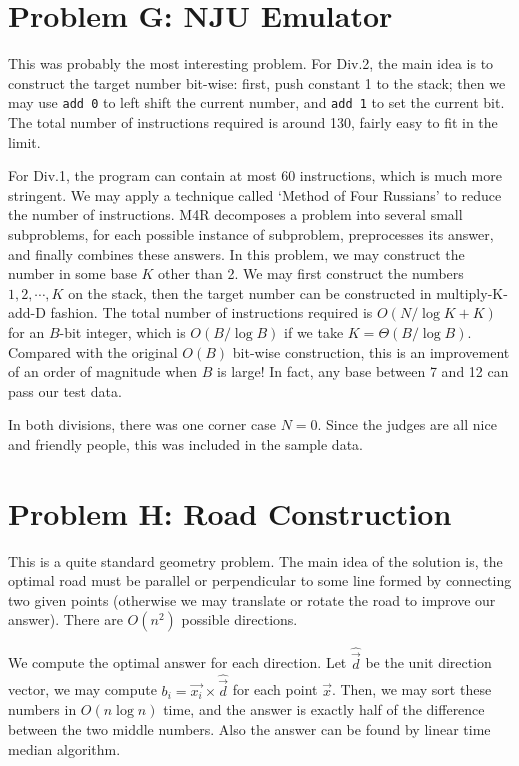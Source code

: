 \documentclass[a4paper,10.5pt,twoside]{article}
\begin{document}
\section*{Problem G: NJU Emulator}

This was probably the most interesting problem. For Div.2, the main idea is to construct the target number bit-wise: first, push constant 1 to the stack; then we may use \texttt{add 0} to left shift the current number, and \texttt{add 1} to set the current bit. The total number of instructions required is around 130, fairly easy to fit in the limit.

For Div.1, the program can contain at most 60 instructions, which is much more stringent. We may apply a technique called `Method of Four Russians' to reduce the number of instructions. M4R decomposes a problem into several small subproblems,  for each possible instance of subproblem, preprocesses its answer, and finally combines these answers. In this problem, we may construct the number in some base $K$ other than 2. We may first construct the numbers $1, 2, \cdots, K$ on the stack, then the target number can be constructed in multiply-K-add-D fashion. The total number of instructions required is $O(N / \log K + K)$ for an $B$-bit integer, which is $O(B / \log B)$ if we take $K = \Theta(B / \log B)$. Compared with the original $O(B)$ bit-wise construction, this is an improvement of an order of magnitude when $B$ is large! In fact, any base between 7 and 12 can pass our test data.

In both divisions, there was one corner case $N = 0$. Since the judges are all nice and friendly people, this was included in the sample data.

\section*{Problem H: Road Construction}

This is a quite standard geometry problem. The main idea of the solution is, the optimal road must be parallel or perpendicular to some line formed by connecting two given points (otherwise we may translate or rotate the road to improve our answer). There are $O(n^2)$ possible directions.

We compute the optimal answer for each direction. Let $\hat{\vec{d}}$ be the unit direction vector, we may compute $b_i = \vec{x_i} \times \hat{\vec{d}}$ for each point $\vec{x}$. Then, we may sort these numbers in $O(n \log n)$ time, and the answer is exactly half of the difference between the two middle numbers. Also the answer can be found by linear time median algorithm.
\end{document}
